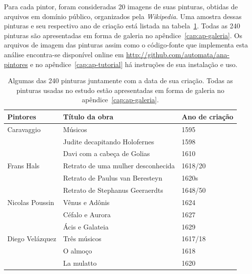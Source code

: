 Para cada pintor, foram consideradas 20 imagens de suas pinturas,
obtidas de arquivos em domínio público, organizados pela
\textit{Wikipedia}. Uma amostra dessas pinturas e seu respectivo ano de criação
está listada na tabela~\ref{tab:paintings}. Todas as 240 pinturas são
apresentadas em forma de galeria no apêndice~\ref{cap:ap-galeria}. Os
arquivos de imagem das pinturas assim como o código-fonte que
implementa esta análise encontra-se disponível online em
\url{http://github.com/automata/ana-pintores} e no
apêndice~\ref{cap:ap-tutorial} há instruções de sua instalação e uso.

\begin{table}[h!] 
  \begin{center}
  \caption{\label{tab:paintings} Algumas das 240 pinturas juntamente
    com a data de sua criação. Todas as pinturas usadas no estudo
    estão apresentadas em forma de galeria no
    apêndice~\ref{cap:ap-galeria}.}

\begin{tabular}{l|l|l}
\hline

 Pintores & Título da obra                       & Ano de criação \\ 
 
 \hline

 Caravaggio          & Músicos & 1595 \\
                     & Judite decapitando Holofernes & 1598 \\
                     & Davi com a cabeça de Golias & 1610 \\
                      
 Frans Hals          & Retrato de uma mulher desconhecida & 1618/20 \\
                     & Retrato de Paulus van Beresteyn & 1620s \\
                     & Retrato de Stephanus Geeraerdts & 1648/50 \\

 Nicolas Poussin     & Vênus e Adônis & 1624 \\
                     & Céfalo e Aurora & 1627 \\
                     & Ácis e Galateia & 1629 \\
 
 Diego Velázquez     & Três músicos & 1617/18 \\
                     & O almoço & 1618 \\
                     & La mulatto & 1620 \\
 

\end{tabular}
\end{center}
\end{table}

